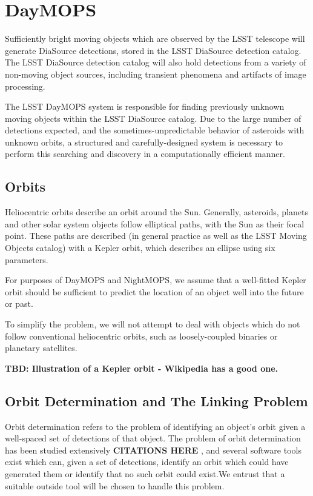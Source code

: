 \section{DayMOPS}
\label{linking}

Sufficiently bright moving objects which are observed by the LSST
telescope will generate DiaSource detections, stored in the LSST
DiaSource detection catalog.  The LSST DiaSource detection catalog
will also hold detections from a variety of non-moving object sources,
including transient phenomena and artifacts of image processing.

The LSST DayMOPS system is responsible for finding previously unknown
moving objects within the LSST DiaSource catalog.  Due to the large
number of detections expected, and the sometimes-unpredictable
behavior of asteroids with unknown orbits, a structured and
carefully-designed system is necessary to perform this searching and
discovery in a computationally efficient manner.






\subsection{Orbits}
Heliocentric orbits describe an orbit around the Sun.  Generally,
asteroids, planets and other solar system objects follow elliptical
paths, with the Sun as their focal point.  These paths are described (in general
practice as well as the LSST Moving Objects catalog) with a Kepler
orbit, which describes an ellipse using six parameters. 

For purposes of DayMOPS and NightMOPS, we assume that a well-fitted
Kepler orbit should be sufficient to predict the location of an object
well into the future or past.  

To simplify the problem, we will not attempt to deal with objects
which do not follow conventional heliocentric orbits, such as
loosely-coupled binaries or planetary satellites.


\textbf{TBD: Illustration of a Kepler orbit - Wikipedia has a good one.}


\subsection{Orbit Determination and The Linking Problem}
Orbit determination refers to the problem of identifying an object's
orbit given a well-spaced set of detections of that object.  The
problem of orbit determination has been studied extensively \textbf{
  CITATIONS HERE }, and several software tools exist which can, given
a set of detections, identify an orbit which could have generated them
or identify that no such orbit could exist.We entrust that a suitable
outside tool will be chosen to handle this problem.

